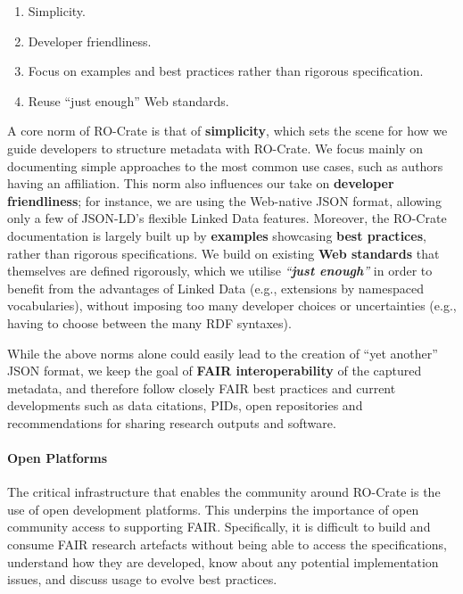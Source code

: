 \begin{enumerate}
\item
  Simplicity.
\item
  Developer friendliness.
\item
  Focus on examples and best practices rather than rigorous
  specification.
\item
  Reuse ``just enough'' Web standards.
\end{enumerate}

A core norm of RO-Crate is that of \textbf{simplicity}, which sets the
scene for how we guide developers to structure metadata with RO-Crate.
We focus mainly on documenting simple approaches to the most common use
cases, such as authors having an affiliation. This norm also influences
our take on \textbf{developer friendliness}; for instance, we are using
the Web-native JSON format, allowing only a few of JSON-LD's flexible
Linked Data features. Moreover, the RO-Crate documentation is largely
built up by \textbf{examples} showcasing \textbf{best practices}, rather
than rigorous specifications. We build on existing \textbf{Web
standards} that themselves are defined rigorously, which we utilise
\emph{``\textbf{just enough}''} in order to benefit from the advantages
of Linked Data (e.g., extensions by namespaced vocabularies), without
imposing too many developer choices or uncertainties (e.g., having to
choose between the many RDF syntaxes).

While the above norms alone could easily lead to the creation of ``yet
another'' JSON format, we keep the goal of \textbf{FAIR
interoperability} of the captured metadata, and therefore follow closely
FAIR best practices and current developments such as data citations,
PIDs, open repositories and recommendations for sharing research outputs
and software.

\paragraph{Open Platforms}\label{ch5:open-platforms}

The critical infrastructure that enables the community around RO-Crate
is the use of open development platforms. This underpins the importance
of open community access to supporting FAIR. Specifically, it is
difficult to build and consume FAIR research artefacts without being
able to access the specifications, understand how they are developed,
know about any potential implementation issues, and discuss usage to
evolve best practices.

